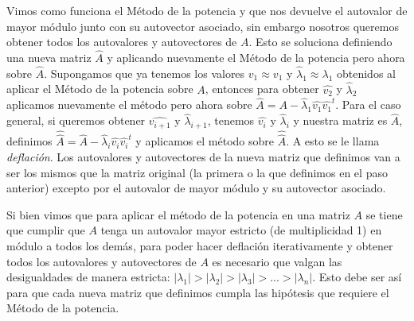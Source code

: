 \par Vimos como funciona el Método de la potencia y que nos devuelve el autovalor de mayor módulo junto con su autovector asociado, sin embargo nosotros queremos obtener todos los autovalores y autovectores de $A$. Esto se soluciona definiendo una nueva matriz $\widehat{A}$ y aplicando nuevamente el Método de la potencia pero ahora sobre $\widehat{A}$. Supongamos que ya tenemos los valores $\widehat{v_1} \approx v_1$ y $\widehat{\lambda}_1 \approx \lambda_1$ obtenidos al aplicar el Método de la potencia sobre $A$, entonces para obtener $\widehat{v_2}$ y $\widehat{\lambda}_2$ aplicamos nuevamente el método pero ahora sobre $\widehat{A} = A - \widehat{\lambda}_1\widehat{v_1}\widehat{v_1}^t$. Para el caso general, si queremos obtener $\widehat{v_{i + 1}}$ y $\widehat{\lambda}_{i + 1}$, tenemos $\widehat{v_i}$ y $\widehat{\lambda}_i$ y nuestra matriz es $\widehat{A}$, definimos $\widehat{\widehat{A}} = \widehat{A} - \widehat{\lambda}_i\widehat{v_i}\widehat{v_i}^t$ y aplicamos el método sobre $\widehat{\widehat{A}}$. A esto se le llama \textit{deflación}. Los autovalores y autovectores de la nueva matriz que definimos van a ser los mismos que la matriz original (la primera o la que definimos en el paso anterior) excepto por el autovalor de mayor módulo y su autovector asociado.
\par Si bien vimos que para aplicar el método de la potencia en una matriz $A$ se tiene que cumplir que $A$ tenga un autovalor mayor estricto (de multiplicidad 1) en módulo a todos los demás, para poder hacer deflación iterativamente y obtener todos los autovalores y autovectores de $A$ es necesario que valgan las desigualdades de manera estricta: $|\lambda_1| > |\lambda_2| > |\lambda_3| > ... > |\lambda_n|$. Esto debe ser así para que cada nueva matriz que definimos cumpla las hipótesis que requiere el Método de la potencia.